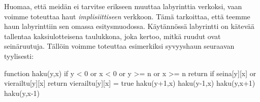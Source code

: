 Huomaa, että meidän ei tarvitse erikseen muuttaa labyrinttia
verkoksi, vaan voimme toteuttaa haut \emph{implisiittiseen} verkkoon.
Tämä tarkoittaa, että teemme haun labyrinttiin sen omassa
esitysmuodossa. Käytännössä labyrintti on kätevää tallentaa kaksiulotteisena
taulukkona, joka kertoo, mitkä ruudut ovat seinäruutuja.
Tällöin voimme toteuttaa esimerkiksi syvyyshaun seuraavan tyylisesti:

\begin{code}
function haku(y,x)
    if y < 0 or x < 0 or y >= n or x >= n
        return
    if seina[y][x] or vierailtu[y][x]
        return
    vierailtu[y][x] = true
    haku(y+1,x)
    haku(y-1,x)
    haku(y,x+1)
    haku(y,x-1)
\end{code}
